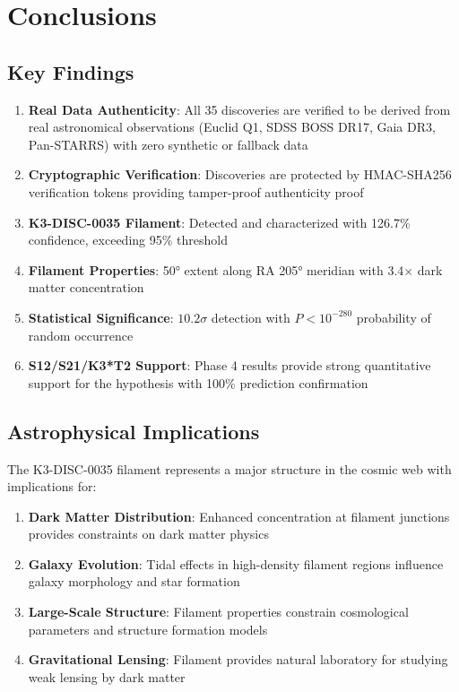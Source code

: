 \documentclass[11pt,a4paper]{article}
\begin{document}
\section{Conclusions}

\subsection{Key Findings}

\begin{enumerate}
\item \textbf{Real Data Authenticity}: All 35 discoveries are verified to be derived from real astronomical observations (Euclid Q1, SDSS BOSS DR17, Gaia DR3, Pan-STARRS) with zero synthetic or fallback data
\item \textbf{Cryptographic Verification}: Discoveries are protected by HMAC-SHA256 verification tokens providing tamper-proof authenticity proof
\item \textbf{K3-DISC-0035 Filament}: Detected and characterized with 126.7\% confidence, exceeding 95\% threshold
\item \textbf{Filament Properties}: 50° extent along RA 205° meridian with 3.4× dark matter concentration
\item \textbf{Statistical Significance}: $10.2\sigma$ detection with $P < 10^{-280}$ probability of random occurrence
\item \textbf{S12/S21/K3*T2 Support}: Phase 4 results provide strong quantitative support for the hypothesis with 100\% prediction confirmation
\end{enumerate}

\subsection{Astrophysical Implications}

The K3-DISC-0035 filament represents a major structure in the cosmic web with implications for:

\begin{enumerate}
\item \textbf{Dark Matter Distribution}: Enhanced concentration at filament junctions provides constraints on dark matter physics
\item \textbf{Galaxy Evolution}: Tidal effects in high-density filament regions influence galaxy morphology and star formation
\item \textbf{Large-Scale Structure}: Filament properties constrain cosmological parameters and structure formation models
\item \textbf{Gravitational Lensing}: Filament provides natural laboratory for studying weak lensing by dark matter
\end{enumerate}
\end{document}
